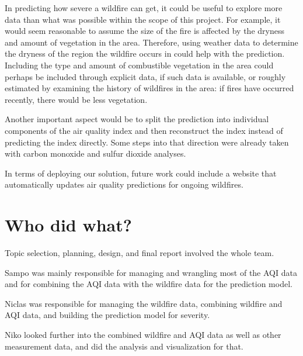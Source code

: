 \documentclass[a4paper,12pt]{article}
\begin{document}
In predicting how severe a wildfire can get, it could be useful to explore more data than what was possible within the scope of this project. For example, it would seem reasonable to assume the size of the fire is affected by the dryness and amount of vegetation in the area. Therefore, using weather data to determine the dryness of the region the wildfire occurs in could help with the prediction. Including the type and amount of combustible vegetation in the area could perhaps be included through explicit data, if such data is available, or roughly estimated by examining the history of wildfires in the area: if fires have occurred recently, there would be less vegetation.

Another important aspect would be to split the prediction into individual components of the air quality index and then reconstruct the index instead of predicting the index directly. Some steps into that direction were already taken with carbon monoxide and sulfur dioxide analyses.

In terms of deploying our solution, future work could include a website that automatically updates air quality predictions for ongoing wildfires.

\section{Who did what?}

Topic selection, planning, design, and final report involved the whole team.

Sampo was mainly responsible for managing and wrangling most of the AQI data and for combining the AQI data with the wildfire data for the prediction model.

Niclas was responsible for managing the wildfire data, combining wildfire and AQI data, and building the prediction model for severity.

Niko looked further into the combined wildfire and AQI data as well as other measurement data, and did the analysis and visualization for that.
\end{document}
